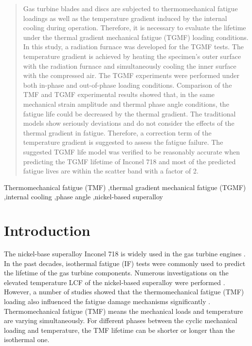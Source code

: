\documentclass[preprint,5p,twocolumn,11pt,sort&compress]{elsarticle}
\begin{document}
\begin{frontmatter}
\begin{abstract}
Gas turbine blades and discs are subjected to thermomechanical fatigue loadings as well as the temperature gradient induced by the internal cooling during operation. Therefore, it is necessary to evaluate the lifetime under the thermal gradient mechanical fatigue (TGMF) loading conditions.
In this study, a radiation furnace was developed for the TGMF tests. The temperature gradient is achieved by heating the specimen's outer surface with the radiation furnace and simultaneously cooling the inner surface with the compressed air. The TGMF experiments were performed under both in-phase and out-of-phase loading conditions. Comparison of the TMF and TGMF experimental results showed that, in the same mechanical strain amplitude and thermal phase angle conditions, the fatigue life could be decreased by the thermal gradient. The traditional models show seriously deviations and do not consider the effects of the thermal gradient in fatigue. Therefore, a correction term of the temperature gradient is suggested to assess the fatigue failure. The suggested TGMF life model was verified to be reasonably accurate when predicting the TGMF lifetime of Inconel 718 and most of the predicted fatigue lives are within the scatter band with a factor of 2.
\end{abstract}

%
\begin{keyword}
Thermomechanical fatigue (TMF) \sep thermal gradient mechanical fatigue (TGMF) \sep internal cooling \sep phase angle \sep nickel-based superalloy

\end{keyword}
\end{frontmatter}

\section{Introduction}
The nickel-base superalloy Inconel 718 is widely used in the gas turbine engines \cite{Pollock2006}. In the past decades, isothermal fatigue (IF) tests were commonly used to predict the lifetime of the gas turbine components. Numerous investigations on the elevated temperature LCF of the nickel-based superalloy were performed \cite{Koch85, Morrow88, Mahobia2014, Chen2016}. However, a number of studies showed that the thermomechanical fatigue (TMF) loading also influenced the fatigue damage mechanisms significantly \cite{Evans2008, Bauer2009, Kulawinski2015, SCHLESINGER2017242, DENG2019813, SUN2019228}. Thermomechanical fatigue (TMF) means the mechanical loads and temperature are varying simultaneously. For different phases between the cyclic mechanical loading and temperature, the TMF lifetime can be shorter or longer than the isothermal one.
\end{document}
